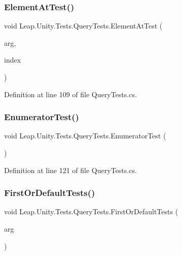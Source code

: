 \subsubsection{\texorpdfstring{ElementAtTest()}{ElementAtTest()}}
{\footnotesize\ttfamily void Leap.\+Unity.\+Tests.\+Query\+Tests.\+Element\+At\+Test (\begin{DoxyParamCaption}\item[{\mbox{[}\+Value\+Source(\char`\"{}list0\char`\"{})\mbox{]} \mbox{\hyperlink{class_leap_1_1_unity_1_1_tests_1_1_query_tests_1_1_query_arg}{Query\+Arg}}}]{arg,  }\item[{\mbox{[}\+Values(0, 3, 100)\mbox{]} int}]{index }\end{DoxyParamCaption})}



Definition at line 109 of file Query\+Tests.\+cs.

\mbox{\label{class_leap_1_1_unity_1_1_tests_1_1_query_tests_a71d64345aedbf5a5556dcc154af06218}} 
\subsubsection{\texorpdfstring{EnumeratorTest()}{EnumeratorTest()}}
{\footnotesize\ttfamily void Leap.\+Unity.\+Tests.\+Query\+Tests.\+Enumerator\+Test (\begin{DoxyParamCaption}{ }\end{DoxyParamCaption})}



Definition at line 121 of file Query\+Tests.\+cs.

\mbox{\label{class_leap_1_1_unity_1_1_tests_1_1_query_tests_a2140f1aa85ae7639e9919aaa2fdc7d4b}} 
\subsubsection{\texorpdfstring{FirstOrDefaultTests()}{FirstOrDefaultTests()}}
{\footnotesize\ttfamily void Leap.\+Unity.\+Tests.\+Query\+Tests.\+First\+Or\+Default\+Tests (\begin{DoxyParamCaption}\item[{\mbox{[}\+Value\+Source(\char`\"{}list0\char`\"{})\mbox{]} \mbox{\hyperlink{class_leap_1_1_unity_1_1_tests_1_1_query_tests_1_1_query_arg}{Query\+Arg}}}]{arg }\end{DoxyParamCaption})}



